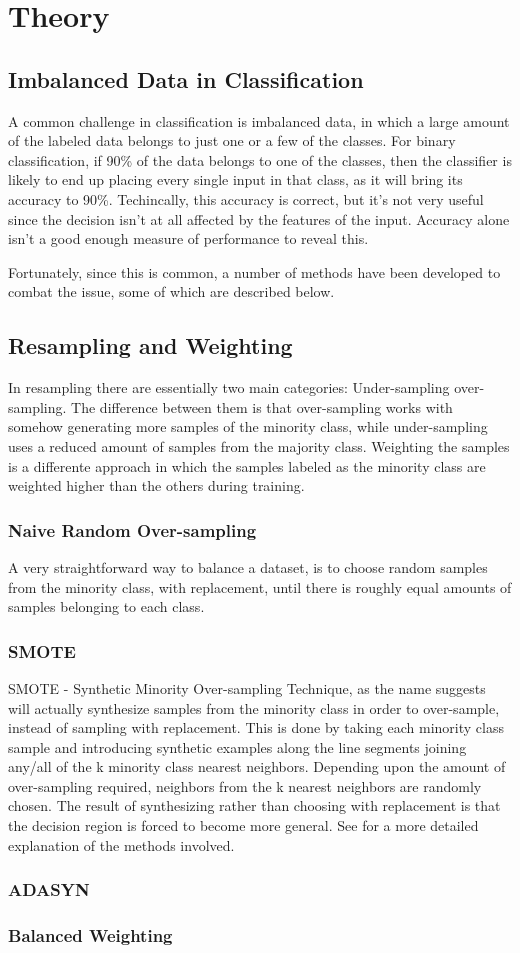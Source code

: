 \section{Theory}
\subsection{Imbalanced Data in Classification}
A common challenge in classification is imbalanced data, in which a large
amount of the labeled data belongs to just one or a few of the classes.
For binary classification, if 90\% of the data belongs to one of the classes,
then the classifier is likely to end up placing every single
input in that class, as it will bring its accuracy to 90\%. Techincally, this
accuracy is correct, but it's not very useful since the decision isn't at all
affected by the features of the input. Accuracy alone isn't a good enough
measure of performance to reveal this.

Fortunately, since this is common, a number of methods have been developed
to combat the issue, some of which are described below.

\subsection{Resampling and Weighting}
In resampling there are essentially two main categories: Under-sampling
over-sampling. The difference between them is that over-sampling works with
somehow generating more samples of the minority class, while under-sampling
uses a reduced amount of samples from the majority class.
Weighting the samples is a differente approach in which the samples labeled
as the minority class are weighted higher than the others during training.

\subsubsection{Naive Random Over-sampling}
A very straightforward way to balance a dataset, is to choose random samples 
from the minority class, with replacement, until there is roughly equal
amounts of samples belonging to each class.

\subsubsection{SMOTE}
SMOTE - Synthetic Minority Over-sampling Technique, as the name suggests will
actually synthesize samples from the minority class in order to over-sample,
instead of sampling with replacement. This is done by taking each minority 
class sample and introducing synthetic examples along the line segments joining 
any/all of the k minority class nearest neighbors. Depending upon the amount of 
over-sampling required, neighbors from the k nearest neighbors are randomly
chosen. The result of synthesizing rather than choosing with replacement is
that the decision region is forced to become more general.
See \cite{smote-article} for a more detailed explanation of the methods
involved.

\subsubsection{ADASYN}
\subsubsection{Balanced Weighting}


